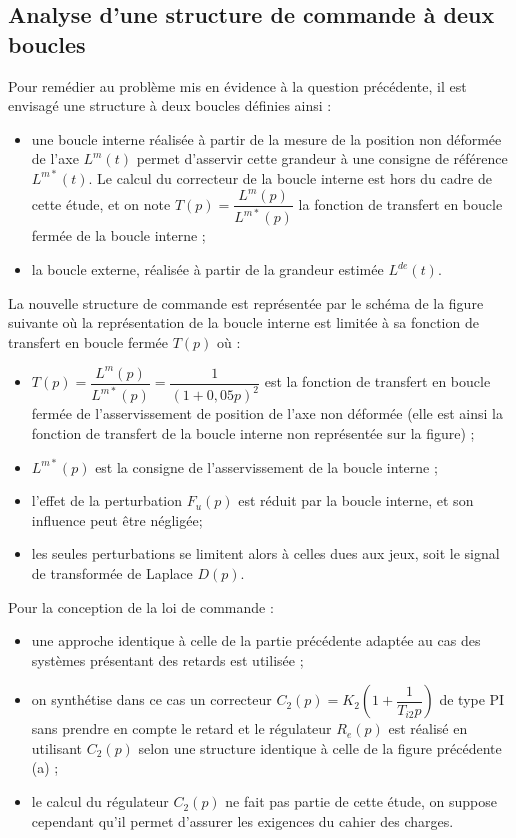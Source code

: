 \ifprof
\begin{corrige}
\end{corrige}
\else
\fi

\subsection*{Analyse d’une structure de commande à deux boucles}

Pour remédier au problème mis en évidence à la question précédente, il est envisagé une structure à deux boucles définies ainsi :
\begin{itemize}
\item une boucle interne réalisée à partir de la mesure de la position non déformée de l’axe $L^m(t)$ permet d’asservir cette grandeur à une consigne de référence $L^{m*}(t)$. Le calcul du correcteur de la boucle interne est hors du cadre de cette étude, et on note $T(p)=\dfrac{L^m(p)}{L^{m*}(p)}$ la fonction de transfert en boucle fermée de la boucle
interne ;
\item la boucle externe, réalisée à partir de la grandeur estimée $L^{de}(t)$.
\end{itemize}
La nouvelle structure de commande est représentée par le schéma de la figure suivante où la représentation de la
boucle interne est limitée à sa fonction de transfert en boucle fermée $T(p)$ où :
\begin{itemize}
\item $T(p) = \dfrac{L^m(p)}{L^{m*}(p)}= \dfrac{1}{\left(1+0,05p\right)^2}$ est la fonction de transfert en boucle fermée de l’asservissement de position de l’axe non déformée (elle est ainsi la fonction de transfert de la boucle interne non représentée sur la figure) ;
\item $L^{m*}(p)$ est la consigne de l’asservissement de la boucle interne ;
\item l’effet de la perturbation $F_u(p)$ est réduit par la boucle interne, et son influence peut être négligée;
\item les seules perturbations se limitent alors à celles dues aux jeux, soit le signal de transformée de Laplace $D(p)$.
\end{itemize}
Pour la conception de la loi de commande :
\begin{itemize}
\item une approche identique à celle de la partie précédente adaptée au cas des systèmes présentant des retards est utilisée ;
\item on synthétise dans ce cas un correcteur $C_2(p) = K_2 \left( 1+\dfrac{1}{T_{i2}p}\right) $ de type PI sans prendre en compte le retard et le régulateur $R_e(p)$ est réalisé en utilisant $C_2(p)$ selon une structure identique à celle de la figure précédente (a) ;
\item le calcul du régulateur $C_2(p)$ ne fait pas partie de cette étude, on suppose cependant qu’il permet d’assurer les exigences du cahier des charges.
\end{itemize}


